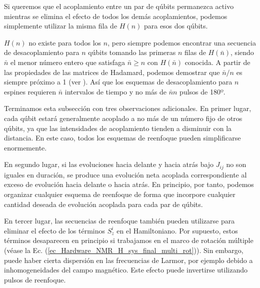 \documentclass[a4paper,11pt]{book} %
\numberwithin{equation}{chapter}
\begin{document}
Si queremos que el acoplamiento entre un par de qúbits permanezca activo mientras se elimina el efecto de todos los demás acoplamientos, podemos simplemente utilizar la misma fila de $H(n)$ para esos dos qúbits. 

$H(n)$ no existe para todos los $n$, pero siempre podemos encontrar una secuencia de desacoplamiento para $n$ qúbits tomando las primeras $n$ filas de $H(\bar{n})$, siendo $\bar{n}$ el menor número entero que satisfaga $\bar{n} \geq n $ con $H(\bar{n})$ conocida. A partir de las propiedades de las matrices de Hadamard, podemos demostrar que $\bar{n}/n$ es siempre próximo a 1 (ver \cite{Hardware_NMR_reenfoque_Hadammard_1}). Así que los esquemas de desacoplamiento para $n$ espines requieren $\bar{n}$ intervalos de tiempo y no más de $\bar{n}n$ pulsos de 180º.

Terminamos esta subsección con tres observaciones adicionales.
En primer lugar, cada qúbit estará generalmente acoplado a no más de un número fijo de otros qúbits, ya que las intensidades de acoplamiento tienden a disminuir con la distancia. En este caso, todos los esquemas de reenfoque pueden simplificarse enormemente. 

En segundo lugar, si las evoluciones hacia delante y hacia atrás bajo
$J_{ij}$ no son iguales en duración, se produce una evolución neta acoplada correspondiente al exceso de evolución hacia delante o hacia atrás. En principio, por tanto, podemos organizar cualquier esquema de reenfoque de forma que incorpore cualquier cantidad deseada de evolución acoplada para cada par de qúbits.

En tercer lugar, las secuencias de reenfoque también pueden utilizarse para eliminar el efecto de los términos $S_{z}^i$ en el Hamiltoniano. Por supuesto, estos términos desaparecen en principio si trabajamos en el marco de rotación múltiple (véase la Ec. (\ref{ec_Hardware_NMR_H_sys_final_multi_rot})). Sin embargo, puede haber cierta dispersión en las frecuencias de Larmor, por ejemplo debido a inhomogeneidades del campo magnético. Este efecto puede invertirse utilizando pulsos de reenfoque.


















	
\end{document}
